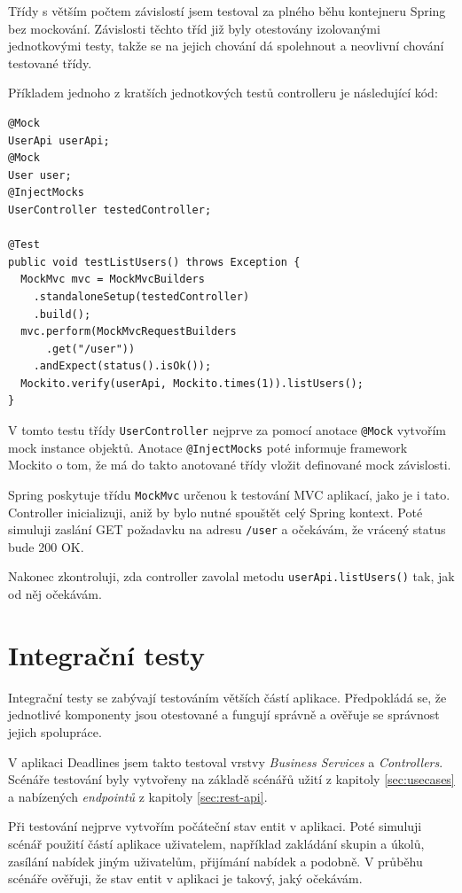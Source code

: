 \documentclass[thesis=B,czech]{FITthesis}[2012/06/26]
\begin{document}
		Třídy s větším počtem závislostí jsem testoval za plného běhu kontejneru Spring bez mockování. Závislosti těchto tříd již byly otestovány izolovanými jednotkovými testy, takže se na jejich chování dá spolehnout a neovlivní chování testované třídy.
		
		Příkladem jednoho z kratších jednotkových testů controlleru je následující kód:
		
		\begin{Verbatim}
@Mock
UserApi userApi;
@Mock
User user;
@InjectMocks
UserController testedController;

@Test
public void testListUsers() throws Exception {
  MockMvc mvc = MockMvcBuilders
    .standaloneSetup(testedController)
    .build();
  mvc.perform(MockMvcRequestBuilders
      .get("/user"))
    .andExpect(status().isOk());
  Mockito.verify(userApi, Mockito.times(1)).listUsers();
}
		\end{Verbatim}
		
		V tomto testu třídy \texttt{UserController} nejprve za pomocí anotace \texttt{@Mock} vytvořím mock instance objektů. Anotace \texttt{@InjectMocks} poté informuje framework Mockito o tom, že má do takto anotované třídy vložit definované mock závislosti.
		
		Spring poskytuje třídu \texttt{MockMvc} určenou k testování MVC aplikací, jako je i tato. Controller inicializuji, aniž by bylo nutné spouštět celý Spring kontext. Poté simuluji zaslání GET požadavku na adresu \texttt{/user} a očekávám, že vrácený status bude 200 OK.
		
		Nakonec zkontroluji, zda controller zavolal metodu \texttt{userApi.listUsers()} tak, jak od něj očekávám. 
		
	\section{Integrační testy}
		Integrační testy se zabývají testováním větších částí aplikace. Předpokládá se, že jednotlivé komponenty jsou otestované a fungují správně a ověřuje se správnost jejich spolupráce.
		
		V aplikaci Deadlines jsem takto testoval vrstvy \textit{Business Services} a \textit{Controllers}. Scénáře testování byly vytvořeny na základě scénářů užití z kapitoly \ref{sec:usecases} a nabízených \textit{endpointů} z kapitoly \ref{sec:rest-api}.
		
		Při testování nejprve vytvořím počáteční stav entit v aplikaci. Poté simuluji scénář použití částí aplikace uživatelem, například zakládání skupin a úkolů, zasílání nabídek jiným uživatelům, přijímání nabídek a podobně. V průběhu scénáře ověřuji, že stav entit v aplikaci je takový, jaký očekávám.
		
\end{document}
